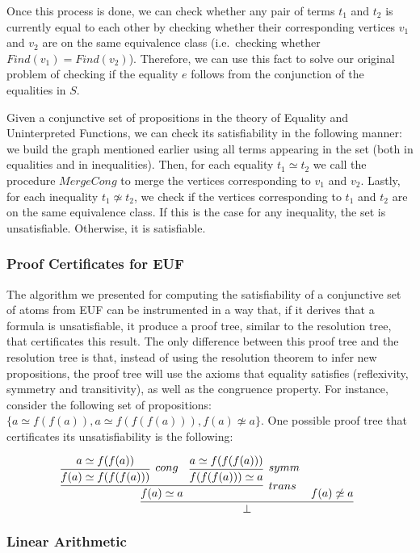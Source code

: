 Once this process is done, we can check whether any pair of terms $t_{1}$ and $t_{2}$ is currently equal to each other by checking whether their corresponding vertices $v_{1}$ and $v_{2}$ are on the same equivalence class (i.e.\ checking whether $Find(v_{1}) = Find(v_{2})$). Therefore, we can use this fact to solve our original problem of checking if the equality $e$ follows from the conjunction of the equalities in $S$.

Given a conjunctive set of propositions in the theory of Equality and Uninterpreted Functions, we can check
its satisfiability in the following manner: we build the graph mentioned earlier using
all terms appearing in the set (both in equalities and in inequalities). Then, for
each equality $t_{1} \simeq t_{2}$ we call the procedure $MergeCong$ to merge the vertices corresponding to $v_{1}$ and $v_{2}$.
Lastly, for each inequality $t_{1} \not\simeq t_{2}$, we check if the vertices corresponding to $t_{1}$ and $t_{2}$ are on the same equivalence class. If this is the case for any inequality, the set is unsatisfiable. Otherwise, it is satisfiable.

\subsubsection{Proof Certificates for EUF}\label{pcEUF}

The algorithm we presented for computing the satisfiability of a conjunctive set of
atoms from EUF can be instrumented in a way that, if it derives that a formula is
unsatisfiable, it produce a proof tree, similar to the resolution tree, that
certificates this result.
The only difference between this proof tree and the resolution tree is that, instead of using the resolution theorem to infer new propositions, the proof tree will use the axioms that equality satisfies (reflexivity, symmetry and transitivity), as well as the congruence property. For instance, consider the following set of propositions: $\{a \simeq f(f(a)), a \simeq f(f(f(a))), f(a) \not\simeq a\}$. One possible proof tree that certificates its unsatisfiability is the following:

\[
  \infer[]{\bot}{\infer[trans]{f(a) \simeq a}{\infer[cong]{f(a) \simeq f(f(f(a)))}{a \simeq f(f(a))} & \infer[symm]{f(f(f(a))) \simeq a}{a \simeq f(f(f(a)))}} & f(a) \not\simeq a}
\]

\subsubsection{Linear Arithmetic}

